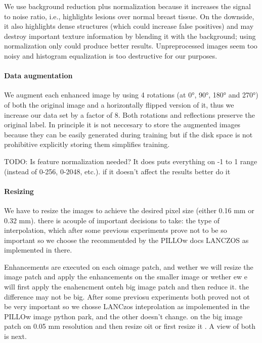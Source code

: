 We use background reduction plus normalization because it increases the signal to noise ratio, i.e., highlights lesions over normal breast tissue. On the downside, it also highlights dense structures (which could increase false positives) and may destroy important texture information by blending it with the background; using normalization only could produce better results. Unpreprocessed images seem too noisy and histogram equalization is too destructive for our purposes.


\paragraph{Data augmentation}
We augment each enhanced image by using 4 rotations (at 0°, 90°, 180° and 270°) of both the original image and a horizontally flipped version of it, thus we increase our data set by a factor of 8. Both rotations and reflections preserve the original label. In principle it is not neccesary to store the augmented images because they can be easily generated during training but if the disk space is not prohibitive explicitly storing them simplifies training.

TODO: Is feature normalization needed? It does puts everything on -1 to 1 range (instead of 0-256, 0-2048, etc.). if it doesn't affect the results better do it

\paragraph{Resizing}
We have to resize the images to achieve the desired pixel size (either 0.16 mm or 0.32 mm). there is acouple of important decisions to take: the type of interpolation, which after some previous experiments prove not to be so important so we choose the recommentded by the PILLOw docs LANCZOS as implemented in there.

Enhancements are executed on each oimage patch, 
and wether we will resize the image patch and apply the enhancements on the smaller image or wether ew e will first apply the enahencment onteh big image patch and then reduce it. the difference may not be big. After some previosu experiments both proved not ot be very important so we chosse LANCzos inteprolation as impolemented in the PILLOw image python park, and the other doesn't change.
on the big image patch on 0.05 mm resolution and then resize oit or first resize it . A view of both is next. 


